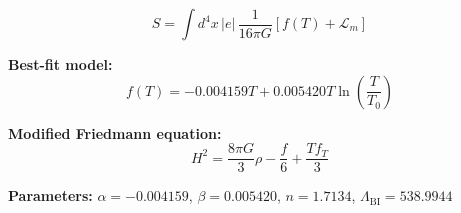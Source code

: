 
\begin{equation}
  S = \int d^4x \, |e| \, \frac{1}{16\pi G} \left[ f(T) + \mathcal{L}_m \right]
\end{equation}

\textbf{Best-fit model:}
\begin{equation}
  f(T) = -0.004159 T + 0.005420 T \ln\!\left(\frac{T}{T_0}\right)
\end{equation}

\textbf{Modified Friedmann equation:}
\begin{equation}
  H^2 = \frac{8\pi G}{3} \rho - \frac{f}{6} + \frac{T f_T}{3}
\end{equation}

\textbf{Parameters:}
$\alpha = -0.004159$, \quad
$\beta = 0.005420$, \quad
$n = 1.7134$, \quad
$\Lambda_{\text{BI}} = 538.9944$